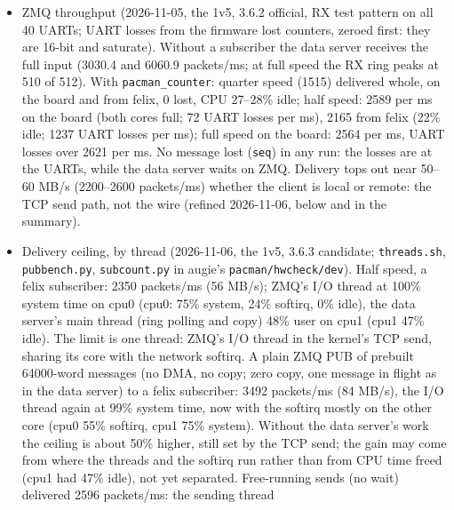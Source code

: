 \documentclass[11pt]{article}
\newcommand{\h}[1]{\texttt{#1}}
\begin{document}
\begin{itemize}
  for review):  a transfer is used only if it is a whole packet (words, then a trailer counting them);
  otherwise it is discarded as an incomplete packet, with a warning, and counted (\h{pacman\_rx\_incomplete\_packets};
  the data server reports it).  Tested twice:  abort, restart of both servers, one 944-byte tail
  discarded, then read-backs 4 of 4 and 64 of 64;  normal running (420000 words, 1500 messages):  no discards.
\item ZMQ throughput (2026-11-05, the 1v5, 3.6.2 official, RX test pattern on all 40 UARTs;  UART losses from the
  firmware lost counters, zeroed first:  they are 16-bit and saturate).  Without a subscriber the data server receives
  the full input (3030.4 and 6060.9 packets/ms;  at full speed the RX ring peaks at 510 of 512).  With
  \h{pacman\_counter}:  quarter speed (1515) delivered whole, on the board and from felix, 0 lost, CPU 27--28\% idle;
  half speed:  2589 per ms on the board (both cores full;  72 UART losses per ms), 2165 from felix (22\% idle;  1237
  UART losses per ms);  full speed on the board:  2564 per ms, UART losses over 2621 per ms.  No message lost
  (\h{seq}) in any run:  the losses are at the UARTs, while the data server waits on ZMQ.  Delivery tops out near
  50--60 MB/s (2200--2600 packets/ms) whether the client is local or remote:  the TCP send path, not the wire
  (refined 2026-11-06, below and in the summary).
\item Delivery ceiling, by thread (2026-11-06, the 1v5, 3.6.3 candidate;  \h{threads.sh}, \h{pubbench.py},
  \h{subcount.py} in augie's \h{pacman/hwcheck/dev}).  Half speed, a felix subscriber:  2350 packets/ms (56 MB/s);  ZMQ's
  I/O thread at 100\% system time on cpu0 (cpu0:  75\% system, 24\% softirq, 0\% idle), the data server's main thread
  (ring polling and copy) 48\% user on cpu1 (cpu1 47\% idle).  The limit is one thread:  ZMQ's I/O thread in the
  kernel's TCP send, sharing its core with the network softirq.  A plain ZMQ PUB of prebuilt 64000-word messages (no
  DMA, no copy;  zero copy, one message in flight as in the data server) to a felix subscriber:  3492 packets/ms
  (84 MB/s), the I/O thread again at 99\% system time, now with the softirq mostly on the other core (cpu0 55\%
  softirq, cpu1 75\% system).  Without the data server's work the ceiling is about 50\% higher, still set by the TCP
  send;  the gain may come from where the threads and the softirq run rather than from CPU time freed (cpu1 had
  47\% idle), not yet separated.  Free-running sends (no wait) delivered 2596 packets/ms:  the sending thread

\end{itemize}
\end{document}
